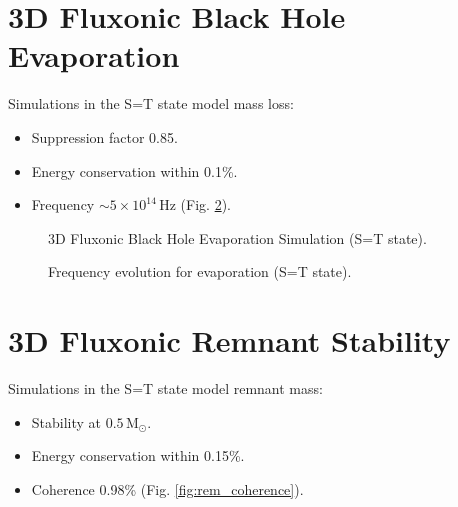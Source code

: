 \documentclass[11pt]{article}
\begin{document}
\section{3D Fluxonic Black Hole Evaporation}
Simulations in the S=T state model mass loss:
\begin{itemize}
    \item Suppression factor 0.85.
    \item Energy conservation within 0.1\%.
    \item Frequency \(\sim 5 \times 10^{14} \, \text{Hz}\) (Fig. \ref{fig:evap_freq}).
\end{itemize}

\begin{figure}[ht]
    \centering
    \caption{3D Fluxonic Black Hole Evaporation Simulation (S=T state).}
    \label{fig:3Devap}
\end{figure}

\begin{figure}[ht]
    \centering
    \caption{Frequency evolution for evaporation (S=T state).}
    \label{fig:evap_freq}
\end{figure}

\section{3D Fluxonic Remnant Stability}
Simulations in the S=T state model remnant mass:
\begin{itemize}
    \item Stability at \(0.5 \, \text{M}_\odot\).
    \item Energy conservation within 0.15\%.
    \item Coherence 0.98\% (Fig. \ref{fig:rem_coherence}).
\end{itemize}
\end{document}
